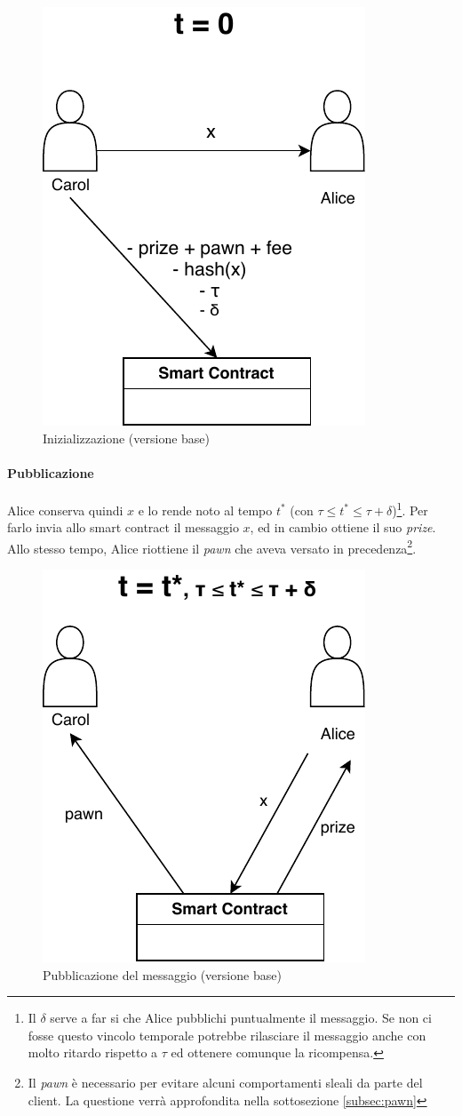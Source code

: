 \begin{figure}[H]
	\centering
	\includegraphics[width=0.3\linewidth]{images/chap_protocollo/base-creazione.pdf}
	\caption{Inizializzazione (versione base)}
\end{figure}

\paragraph{Pubblicazione}
Alice conserva quindi $ x $ e lo rende noto al tempo $ t^{*} $
(con $ \tau \leq t^{*} \leq \tau + \delta $)\footnote{Il $ \delta $ serve a far si che
	Alice pubblichi puntualmente il messaggio. Se non ci fosse questo vincolo temporale
	potrebbe rilasciare il messaggio anche con molto ritardo rispetto a
	$ \tau $ ed ottenere comunque
	la ricompensa.}.
Per farlo invia allo smart contract il messaggio $ x $,
ed in cambio ottiene il suo \textit{prize}.
Allo stesso tempo, Alice riottiene il \textit{pawn}
che aveva versato in precedenza\footnote{
	Il \textit{pawn} è necessario per evitare alcuni comportamenti sleali da parte del client.
	La questione verrà approfondita nella sottosezione \ref{subsec:pawn}}.
\begin{figure}[H]
	\centering
	\includegraphics[width=0.3\linewidth]{images/chap_protocollo/base-pubblicazione.pdf}
	\caption{Pubblicazione del messaggio (versione base)}
\end{figure}


